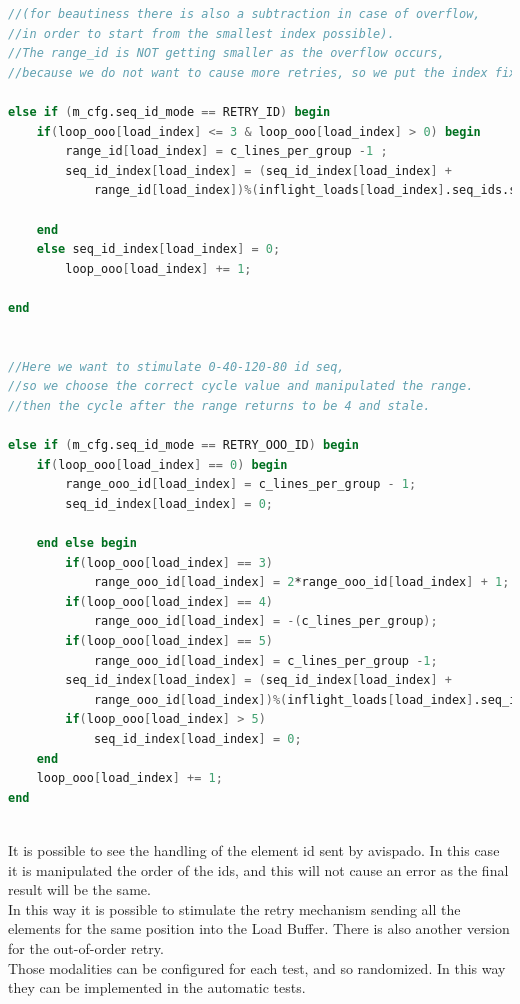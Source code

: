\linespread{1}
\begin{lstlisting}[language=Verilog,style=verilog-style, backgroundcolor=\color{lyel_palette}, frame=tlb]
//(for beautiness there is also a subtraction in case of overflow, 
//in order to start from the smallest index possible).
//The range_id is NOT getting smaller as the overflow occurs, 
//because we do not want to cause more retries, so we put the index fixed to 0

else if (m_cfg.seq_id_mode == RETRY_ID) begin
    if(loop_ooo[load_index] <= 3 & loop_ooo[load_index] > 0) begin
        range_id[load_index] = c_lines_per_group -1 ;
        seq_id_index[load_index] = (seq_id_index[load_index] +
            range_id[load_index])%(inflight_loads[load_index].seq_ids.size());
            
    end
    else seq_id_index[load_index] = 0;
        loop_ooo[load_index] += 1;
        
end


//Here we want to stimulate 0-40-120-80 id seq, 
//so we choose the correct cycle value and manipulated the range.
//then the cycle after the range returns to be 4 and stale.

else if (m_cfg.seq_id_mode == RETRY_OOO_ID) begin
    if(loop_ooo[load_index] == 0) begin
        range_ooo_id[load_index] = c_lines_per_group - 1;
        seq_id_index[load_index] = 0;

    end else begin
        if(loop_ooo[load_index] == 3) 
            range_ooo_id[load_index] = 2*range_ooo_id[load_index] + 1;
        if(loop_ooo[load_index] == 4) 
            range_ooo_id[load_index] = -(c_lines_per_group);
        if(loop_ooo[load_index] == 5) 
            range_ooo_id[load_index] = c_lines_per_group -1;
        seq_id_index[load_index] = (seq_id_index[load_index] +
            range_ooo_id[load_index])%(inflight_loads[load_index].seq_ids.size());
        if(loop_ooo[load_index] > 5) 
            seq_id_index[load_index] = 0;
    end
    loop_ooo[load_index] += 1;
end



\end{lstlisting}
\linespread{1.2}

It is possible to see the handling of the element id sent by avispado. In this case it is manipulated the order of the ids, and this will not cause an error as the final result will be the same.\\

In this way it is possible to stimulate the retry mechanism sending all the elements for the same position into the Load Buffer. There is also another version for the out-of-order retry.\\

Those modalities can be configured for each test, and so randomized. In this way they can be implemented in the automatic tests.
